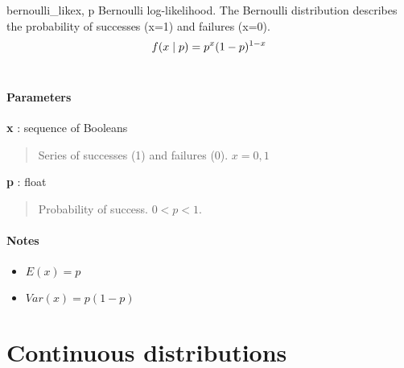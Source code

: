 \hypertarget{pymc.distributions.bernoulli_like}{}
\begin{funcdesc}{bernoulli\_like}{x, p}
Bernoulli log-likelihood. The Bernoulli distribution describes the probability of successes (x=1) and
failures (x=0).
\begin{gather}
\begin{split}f(x \mid p) = p^{x} (1-p)^{1-x}\end{split}\notag\\\begin{split}\end{split}\notag
\end{gather}
\paragraph{Parameters}
\begin{paramlist}
\item[] \textbf{x} : sequence of Booleans
\begin{quote}

Series of successes (1) and failures (0). $x=0,1$
\end{quote}

\item[] \textbf{p} : float
\begin{quote}

Probability of success. $0 < p < 1$.
\end{quote}
\end{paramlist}
\paragraph{Notes}
\begin{itemize}
\item {}
$E(x)= p$

\item {}
$Var(x)= p(1-p)$

\end{itemize}

\end{funcdesc}

\section{Continuous distributions}


